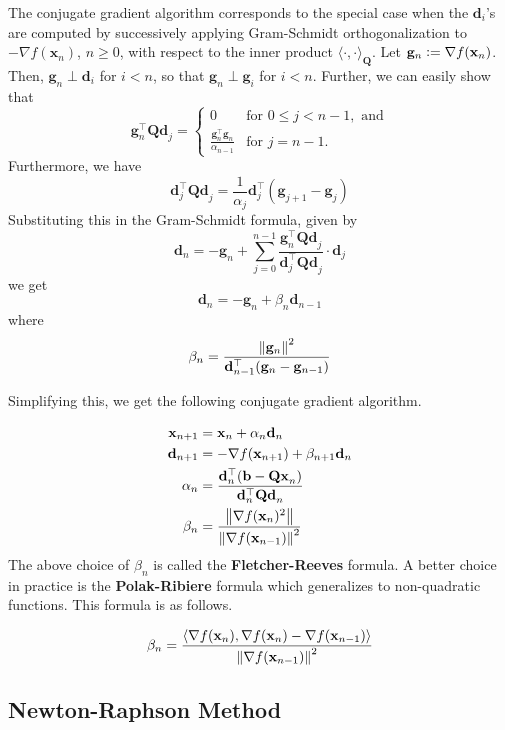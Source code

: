 The conjugate gradient algorithm corresponds to the special case when the $\mathbf{d}_i$'s are computed by successively applying Gram-Schmidt orthogonalization to $-\nabla f(\mathbf{x}_n)$, $n \geq 0$, with respect to the inner product $\langle \cdot, \cdot \rangle_{\mathbf{Q}}$. Let $\mathbf{g}_n \vcentcolon= \nabla f(\mathbf{x}_n)$. Then, $\mathbf{g}_n \perp \mathbf{d}_i$ for $i < n$, so that $\mathbf{g}_n \perp \mathbf{g}_i$ for $i < n$. Further, we can easily show that
\[
    \mathbf{g}_n^{\top} \mathbf{Qd}_j = \begin{cases}
        0 & \text{for }0 \leq j < n-1, \text{ and} \\
        \displaystyle \frac{\mathbf{g}_n^{\top} \mathbf{g}_n}{\alpha_{n-1}} & \text{for } j = n-1.
    \end{cases}
\]
Furthermore, we have
\[
    \mathbf{d}_j^{\top} \mathbf{Qd}_j = \frac{1}{\alpha_j} \mathbf{d}_j^{\top} (\mathbf{g}_{j+1} - \mathbf{g}_j)
\]
Substituting this in the Gram-Schmidt formula, given by
\[
    \mathbf{d}_n = -\mathbf{g}_n + \sum_{j=0}^{n-1} \frac{\mathbf{g}_n^{\top} \mathbf{Qd}_j}{\mathbf{d}_j^{\top} \mathbf{Qd}_j} \cdot \mathbf{d}_j
\]
we get
\[
    \mathbf{d}_n = -\mathbf{g}_n + \beta_n \mathbf{d}_{n-1}
\]
where
\[
    \beta_n = \frac{\norm{\mathbf{g}_n}^2}{\mathbf{d}_{n-1}^{\top} (\mathbf{g}_n - \mathbf{g}_{n-1})}
\]

Simplifying this, we get the following conjugate gradient algorithm.

\begin{align*}
    \mathbf{x}_{n+1} &= \mathbf{x}_n + \alpha_n \mathbf{d}_n \\
    \mathbf{d}_{n+1} &= -\nabla f(\mathbf{x}_{n+1}) + \beta_{n+1} \mathbf{d}_n \\
    \alpha_n &= \frac{\mathbf{d}_n^{\top}(\mathbf{b} - \mathbf{Qx}_n)}{\mathbf{d}_n^{\top}\mathbf{Qd}_n} \\
    \beta_n &= \frac{\norm{\nabla f(\mathbf{x}_n)^2}}{\norm{\nabla f(\mathbf{x}_{n-1})}^2}
\end{align*}
The above choice of $\beta_n$ is called the \textbf{Fletcher-Reeves} formula. A better choice in practice is the \textbf{Polak-Ribiere} formula which generalizes to non-quadratic functions. This formula is as follows.

\[
    \beta_n = \frac{\left\langle \nabla f(\mathbf{x}_n), \nabla f(\mathbf{x}_n) - \nabla f(\mathbf{x}_{n-1}) \right\rangle}{\norm{\nabla f(\mathbf{x}_{n-1})}^2}
\]

\subsection*{Newton-Raphson Method}

